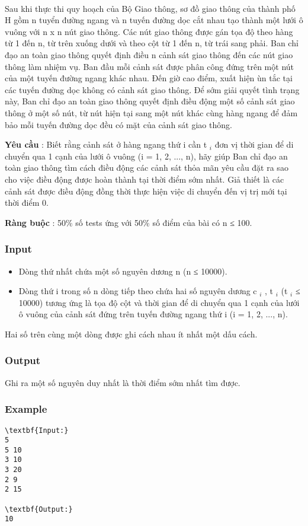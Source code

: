 

 

Sau khi thực thi quy hoạch của Bộ Giao thông, sơ đồ giao thông của thành phố H gồm n tuyển đường ngang và n tuyến đường dọc cắt nhau tạo thành một lưới ô vuông với n x n nút giao thông. Các nút giao thông được gán tọa độ theo hàng từ 1 đến n, từ trên xuống dưới và theo cột từ 1 đến n, từ trái sang phải. Ban chỉ đạo an toàn giao thông quyết định điều n cảnh sát giao thông đến các nút giao thông làm nhiệm vụ. Ban đầu mỗi cảnh sát được phân công đứng trên một nút của một tuyến đường ngang khác nhau. Đến giờ cao điểm, xuất hiện ùn tắc tại các tuyến đường dọc không có cảnh sát giao thông. Để sớm giải quyết tình trạng này, Ban chỉ đạo an toàn giao thông quyết định điều động một số cảnh sát giao thông ở một số nút, từ nút hiện tại sang một nút khác cùng hàng ngang để đảm bảo mỗi tuyến đường dọc đều có mặt của cảnh sát giao thông.

\textbf{Yêu cầu } : Biết rằng cảnh sát ở hàng ngang thứ i cần t $_ i $ đơn vị thời gian để di chuyển qua 1 cạnh của lưới ô vuông (i = 1, 2, ..., n), hãy giúp Ban chỉ đạo an toàn giao thông tìm cách điều động các cảnh sát thỏa mãn yêu cầu đặt ra sao cho việc điều động được hoàn thành tại thời điểm sớm nhất. Giả thiết là các cảnh sát được điều động đồng thời thực hiện việc di chuyển đến vị trị mới tại thời điểm 0.

\textbf{Ràng buộc } : 50\% số tests ứng với 50\% số điểm của bài có n ≤ 100.

\subsubsection{Input}
\begin{itemize}
	\item Dòng thứ nhất chứa một số nguyên dương n (n ≤ 10000).
	\item Dòng thứ i trong số n dòng tiếp theo chứa hai số nguyên dương c $_ i $ , t $_ i $ (t $_ i $ ≤ 10000) tương ứng là tọa độ cột và thời gian để di chuyển qua 1 cạnh của lưới ô vuông của cảnh sát đứng trên tuyến đường ngang thứ i (i = 1, 2, ..., n).
\end{itemize}

Hai số trên cùng một dòng được ghi cách nhau ít nhất một dấu cách.

\subsubsection{Output}

Ghi ra một số nguyên duy nhất là thời điểm sớm nhất tìm được.

\subsubsection{Example}
\begin{verbatim}
\textbf{Input:}
5
5 10
3 10
3 20
2 9
2 15

\textbf{Output:}
10
\end{verbatim}
